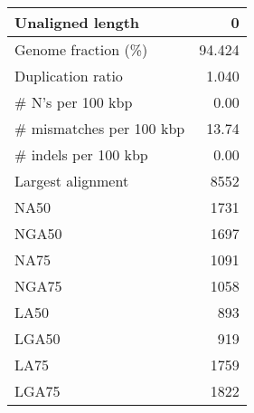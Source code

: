 \documentclass[12pt,a4paper]{article}
\begin{document}
\begin{table}[ht]
\begin{center}
\begin{tabular}{|l*{1}{|r}|}
Unaligned length & 0 \\ \hline
Genome fraction (\%) & 94.424 \\ \hline
Duplication ratio & 1.040 \\ \hline
\# N's per 100 kbp & 0.00 \\ \hline
\# mismatches per 100 kbp & 13.74 \\ \hline
\# indels per 100 kbp & 0.00 \\ \hline
Largest alignment & 8552 \\ \hline
NA50 & 1731 \\ \hline
NGA50 & 1697 \\ \hline
NA75 & 1091 \\ \hline
NGA75 & 1058 \\ \hline
LA50 & 893 \\ \hline
LGA50 & 919 \\ \hline
LA75 & 1759 \\ \hline
LGA75 & 1822 \\ \hline
\end{tabular}
\end{center}
\end{table}
\end{document}
